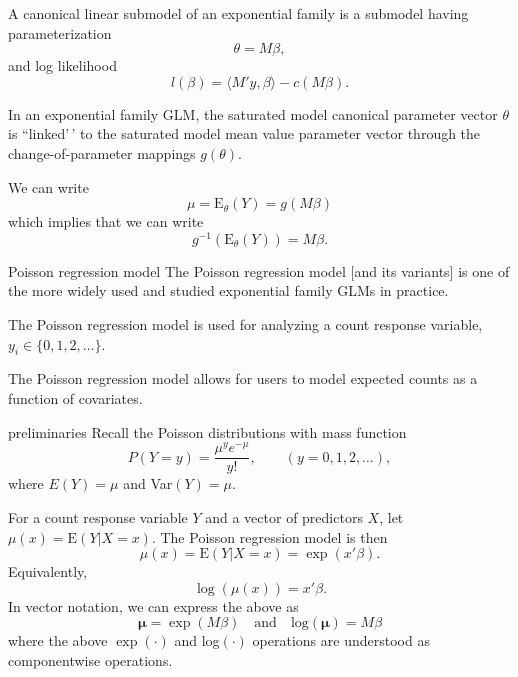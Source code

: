 \documentclass[
  ignorenonframetext,
]{beamer}
\begin{document}
\begin{frame}{}
\protect\hypertarget{section}{}
A canonical linear submodel of an exponential family is a submodel
having parameterization \[
  \theta = M\beta,
\] and log likelihood \begin{equation} \label{subloglike}
  l(\beta) = \langle M'y, \beta \rangle - c(M\beta).
\end{equation}

In an exponential family GLM, the saturated model canonical parameter
vector \(\theta\) is ``linked'\,' to the saturated model mean value
parameter vector through the change-of-parameter mappings \(g(\theta)\).

\vspace{12pt}

We can write \[
 \mu = \text{E}_\theta(Y) = g(M\beta) 
\] which implies that we can write \[
  g^{-1}\left(\text{E}_\theta(Y)\right) = M\beta.
\]
\end{frame}

\begin{frame}{Poisson regression model}
\protect\hypertarget{poisson-regression-model}{}
The Poisson regression model {[}and its variants{]} is one of the more
widely used and studied exponential family GLMs in practice.

\vspace{12pt}

The Poisson regression model is used for analyzing a count response
variable, \(y_i \in \{0,1,2,\ldots\}\).

\vspace{12pt}

The Poisson regression model allows for users to model expected counts
as a function of covariates.
\end{frame}

\begin{frame}{preliminaries}
\protect\hypertarget{preliminaries}{}
Recall the Poisson distributions with mass function \[
  P(Y = y) = \frac{\mu^ye^{-\mu}}{y!}, \qquad (y = 0,1,2,\ldots),
\] where \(E(Y) = \mu\) and Var\((Y) = \mu\).
\end{frame}

\begin{frame}{}
\protect\hypertarget{section-1}{}
For a count response variable \(Y\) and a vector of predictors \(X\),
let \(\mu(x) = \text{E}(Y|X = x)\). The Poisson regression model is then
\begin{equation} \label{loglink}
  \mu(x) = \text{E}(Y|X = x) = \exp\left(x'\beta\right).
\end{equation} Equivalently, \[
  \log\left(\mu(x)\right) = x'\beta.
\] In vector notation, we can express the above as \[
  \bm{\mu}= \exp(M\beta) \quad \text{and} \quad \text{log}(\bm{\mu}) = M\beta
\] where the above \(\exp(\cdot)\) and log\((\cdot)\) operations are
understood as componentwise operations.
\end{frame}
\end{document}
